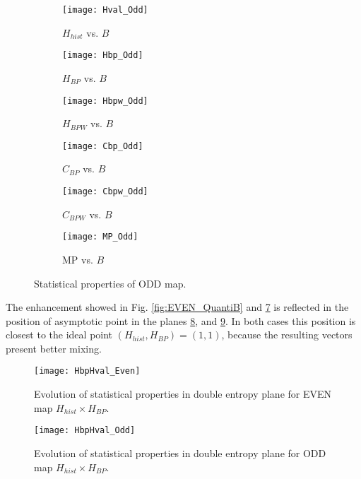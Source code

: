 \begin{figure}[htpb]
	\centering
	\begin{subfigure}[b]{0.49\textwidth}
		\texttt{[image: Hval\_Odd]}
		\caption{$H_{hist}$ vs. $B$}
		\label{fig:Hval_Odd}
	\end{subfigure}
	\begin{subfigure}[b]{0.49\textwidth}
		\texttt{[image: Hbp\_Odd]}
		\caption{$H_{BP}$ vs. $B$}
		\label{fig:Hbp_Odd}
	\end{subfigure}
	\begin{subfigure}[b]{0.49\textwidth}
		\texttt{[image: Hbpw\_Odd]}
		\caption{$H_{BPW}$ vs. $B$}
		\label{fig:Hbpw_Odd}
	\end{subfigure}
	\begin{subfigure}[b]{0.49\textwidth}
		\texttt{[image: Cbp\_Odd]}
		\caption{$C_{BP}$ vs. $B$}
		\label{fig:Cbp_Odd}
	\end{subfigure}
	\begin{subfigure}[b]{0.49\textwidth}
		\texttt{[image: Cbpw\_Odd]}
		\caption{$C_{BPW}$ vs. $B$}
		\label{fig:Cbpw_Odd}
	\end{subfigure}
	\begin{subfigure}[b]{0.49\textwidth}
		\texttt{[image: MP\_Odd]}
		\caption{MP vs. $B$}
		\label{fig:MP_Odd}
	\end{subfigure}
	\caption{Statistical properties of ODD map.}
	\label{fig:ODD_QuantiB}
\end{figure}

The enhancement showed in Fig. \ref{fig:EVEN_QuantiB} and \ref{fig:ODD_QuantiB} is reflected in the position of asymptotic point in the planes \ref{fig:EVEN_HH}, and \ref{fig:ODD_HH}.
In both cases this position is closest to the ideal point $(H_{hist}, H_{BP})=(1, 1)$, because the resulting vectors present better mixing.

\begin{figure}[htpb]
	\centering
	\texttt{[image: HbpHval\_Even]}
	\caption{Evolution of statistical properties in double entropy plane for EVEN map $H_{hist} \times H_{BP}$.}
	\label{fig:EVEN_HH}
\end{figure}

\begin{figure}[htpb]
	\centering
	\texttt{[image: HbpHval\_Odd]}
	\caption{Evolution of statistical properties in double entropy plane for ODD map $H_{hist} \times H_{BP}$.}
	\label{fig:ODD_HH}
\end{figure}

